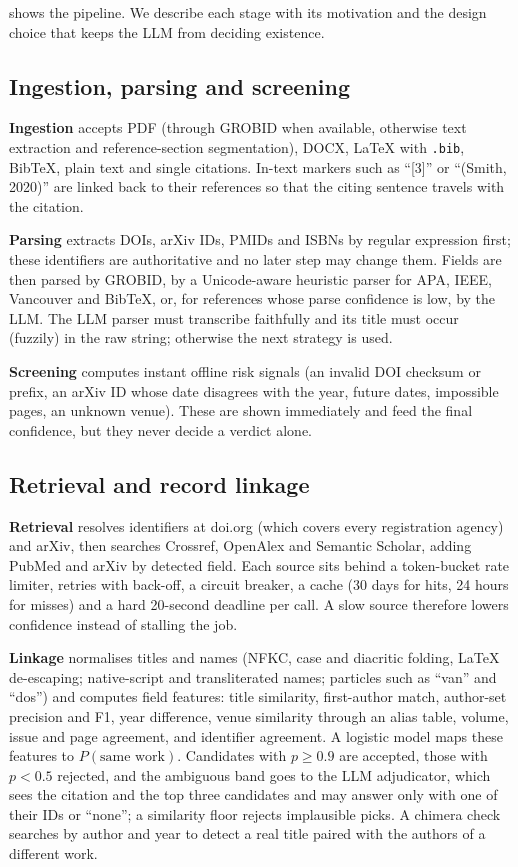 \documentclass[10pt,twocolumn,a4paper]{article}
\begin{document}
 shows the pipeline. We describe each stage with its motivation and the design
choice that keeps the LLM from deciding existence.

\subsection{Ingestion, parsing and screening}
\textbf{Ingestion} accepts PDF (through GROBID \citep{lopez2009grobid} when available, otherwise
text extraction and reference-section segmentation), DOCX, \LaTeX{} with \texttt{.bib}, BibTeX,
plain text and single citations. In-text markers such as ``[3]'' or ``(Smith, 2020)'' are linked back
to their references so that the citing sentence travels with the citation.

\textbf{Parsing} extracts DOIs, arXiv IDs, PMIDs and ISBNs by regular expression first; these
identifiers are authoritative and no later step may change them. Fields are then parsed by GROBID,
by a Unicode-aware heuristic parser for APA, IEEE, Vancouver and BibTeX, or, for references whose
parse confidence is low, by the LLM. The LLM parser must transcribe faithfully and its title must
occur (fuzzily) in the raw string; otherwise the next strategy is used.

\textbf{Screening} computes instant offline risk signals (an invalid DOI checksum or prefix, an
arXiv ID whose date disagrees with the year, future dates, impossible pages, an unknown venue). These
are shown immediately and feed the final confidence, but they never decide a verdict alone.

\subsection{Retrieval and record linkage}
\textbf{Retrieval} resolves identifiers at doi.org (which covers every registration agency) and
arXiv, then searches Crossref, OpenAlex and Semantic Scholar, adding PubMed and arXiv by detected
field. Each source sits behind a token-bucket rate limiter, retries with back-off, a circuit
breaker, a cache (30 days for hits, 24 hours for misses) and a hard 20-second deadline per call. A
slow source therefore lowers confidence instead of stalling the job.

\textbf{Linkage} normalises titles and names (NFKC, case and diacritic folding, \LaTeX{}
de-escaping; native-script and transliterated names; particles such as ``van'' and ``dos'') and
computes field features: title similarity, first-author match, author-set precision and F1, year
difference, venue similarity through an alias table, volume, issue and page agreement, and
identifier agreement. A logistic model maps these features to $P(\text{same work})$. Candidates with
$p\ge0.9$ are accepted, those with $p<0.5$ rejected, and the ambiguous band goes to the LLM
adjudicator, which sees the citation and the top three candidates and may answer only with one of
their IDs or ``none''; a similarity floor rejects implausible picks. A chimera check searches by
author and year to detect a real title paired with the authors of a different work.
\end{document}
